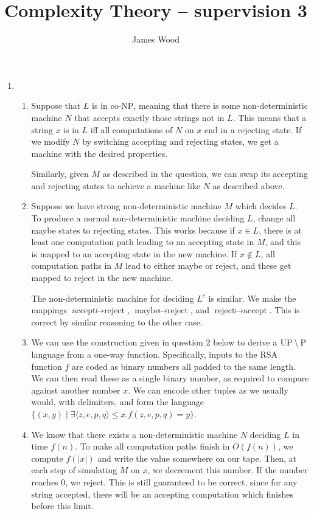 \documentclass{article}
\begin{document}
\title{Complexity Theory -- supervision 3}
\author{James Wood}
\maketitle

\begin{enumerate}
  \item
    \begin{enumerate}[label=\arabic{enumii}.]
      \item
        Suppose that $L$ is in $\textrm{co-NP}$, meaning that there is some non-deterministic machine $N$ that accepts exactly those strings not in $L$. This means that a string $x$ is in $L$ iff all computations of $N$ on $x$ end in a rejecting state. If we modify $N$ by switching accepting and rejecting states, we get a machine with the desired properties.

        Similarly, given $M$ as described in the question, we can swap its accepting and rejecting states to achieve a machine like $N$ as described above.
      \item
        Suppose we have strong non-deterministic machine $M$ which decides $L$. To produce a normal non-deterministic machine deciding $L$, change all maybe states to rejecting states. This works because if $x \in L$, there is at least one computation path leading to an accepting state in $M$, and this is mapped to an accepting state in the new machine. If $x \notin L$, all computation paths in $M$ lead to either maybe or reject, and these get mapped to reject in the new machine.

        The non-deterministic machine for deciding $L^c$ is similar. We make the mappings $\textrm{accept} \mapsto \textrm{reject}$, $\textrm{maybe} \mapsto \textrm{reject}$, and $\textrm{reject} \mapsto \textrm{accept}$. This is correct by similar reasoning to the other case.
      \item We can use the construction given in question 2 below to derive a $\textrm{UP} \setminus \textrm P$ language from a one-way function. Specifically, inputs to the RSA function $f$ are coded as binary numbers all padded to the same length. We can then read these as a single binary number, as required to compare against another number $x$. We can encode other tuples as we usually would, with delimiters, and form the language $\{ (x, y) \mid \exists \langle z, e, p, q \rangle \leq x. f(z, e, p, q) = y \}$.
        \setcounter{enumii}{7}
      \item
        We know that there exists a non-deterministic machine $N$ deciding $L$ in time $f(n)$. To make all computation paths finish in $O(f(n))$, we compute $f(\lvert x \rvert)$ and write the value somewhere on our tape. Then, at each step of simulating $M$ on $x$, we decrement this number. If the number reaches 0, we reject. This is still guaranteed to be correct, since for any string accepted, there will be an accepting computation which finishes before this limit.


\end{enumerate}
\end{enumerate}
\end{document}
